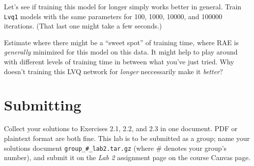 \documentclass[11pt]{cselabheader}
\begin{document}
\begin{itemize}[leftmargin=*]
  \begin{ex}
    Let's see if training this model for longer simply works better in general. Train \texttt{Lvq1} models with the same parameters for 100, 1000, 10000, and 100000 iterations. (That last one might take a few seconds.)

    Estimate where there might be a ``sweet spot'' of training time, where RAE is \textit{generally} minimized for this model on this data. It might help to play around with different levels of training time in between what you've just tried. Why doesn't training this LVQ network for \textit{longer} neccessarily make it \textit{better}?
  \end{ex}
\end{itemize}

\pagebreak

\section{Submitting}

Collect your solutions to Exercises 2.1, 2.2, and 2.3 in one document. PDF or plaintext format are both fine. This lab is to be submitted as a group; name your solutions document \texttt{group\_\#\_lab2.tar.gz} (where \# denotes your group's number), and submit it on the \textit{Lab 2} assignment page on the course Canvas page.
\end{document}
